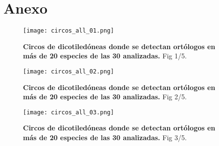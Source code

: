 \setcounter{chapter}{9}
\chapter*{Anexo} 
\setcounter{figure}{0}
\setcounter{table}{0}
\setcounter{section}{0}

\graphicspath{{Appendix/Figs/}}







\setlength{\oddsidemargin}{-1cm}


\begin{landscape}
    \begin{figure}[htbp!] 
        \centering    
        \texttt{[image: circos\_all\_01.png]}
        \caption[Circos de dicotiledóneas (en más de 20 especies). 1/5]{
        \textbf{Circos de dicotiledóneas donde se detectan ortólogos en más de 20 especies de las 30 analizadas.}
        Fig 1/5.
        }
        \label{fig:circos_all_01}
    \end{figure}
\end{landscape}

\begin{landscape}
    \begin{figure}[htbp!] 
        \centering    
        \texttt{[image: circos\_all\_02.png]}
        \caption[Circos de dicotiledóneas (en más de 20 especies). 2/5]{
        \textbf{Circos de dicotiledóneas donde se detectan ortólogos en más de 20 especies de las 30 analizadas.}
        Fig 2/5.
        }
        \label{fig:circos_all_02}
    \end{figure}
\end{landscape}

\begin{landscape}
    \begin{figure}[htbp!] 
        \centering    
        \texttt{[image: circos\_all\_03.png]}
        \caption[Circos de dicotiledóneas (en más de 20 especies). 3/5]{
        \textbf{Circos de dicotiledóneas donde se detectan ortólogos en más de 20 especies de las 30 analizadas.}
        Fig 3/5.
        }
        \label{fig:circos_all_03}
    \end{figure}
\end{landscape}


